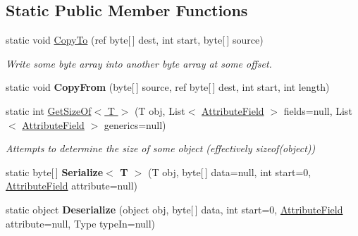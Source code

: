 \subsection*{Static Public Member Functions}
\begin{DoxyCompactItemize}
\item 
static void \hyperlink{class_skyrates_1_1_util_1_1_serializing_1_1_bit_serialize_attribute_ab939972a66980cf31699ec828e872fa8}{Copy\-To} (ref byte\mbox{[}$\,$\mbox{]} dest, int start, byte\mbox{[}$\,$\mbox{]} source)
\begin{DoxyCompactList}\small\item\em Write some byte array into another byte array at some offset. \end{DoxyCompactList}\item 
\hypertarget{class_skyrates_1_1_util_1_1_serializing_1_1_bit_serialize_attribute_ab796a376492fbd2bd32ed0dde197b880}{static void {\bfseries Copy\-From} (byte\mbox{[}$\,$\mbox{]} source, ref byte\mbox{[}$\,$\mbox{]} dest, int start, int length)}\label{class_skyrates_1_1_util_1_1_serializing_1_1_bit_serialize_attribute_ab796a376492fbd2bd32ed0dde197b880}

\item 
static int \hyperlink{class_skyrates_1_1_util_1_1_serializing_1_1_bit_serialize_attribute_a871ad3a2f20271548d0870908ce4df13}{Get\-Size\-Of$<$ T $>$} (T obj, List$<$ \hyperlink{class_skyrates_1_1_util_1_1_serializing_1_1_bit_serialize_attribute_1_1_attribute_field}{Attribute\-Field} $>$ fields=null, List$<$ \hyperlink{class_skyrates_1_1_util_1_1_serializing_1_1_bit_serialize_attribute_1_1_attribute_field}{Attribute\-Field} $>$ generics=null)
\begin{DoxyCompactList}\small\item\em Attempts to determine the size of some object (effectively sizeof(object)) \end{DoxyCompactList}\item 
\hypertarget{class_skyrates_1_1_util_1_1_serializing_1_1_bit_serialize_attribute_ad90f1994f9b3222b2fd6aabf072d8e0d}{static byte\mbox{[}$\,$\mbox{]} {\bfseries Serialize$<$ T $>$} (T obj, byte\mbox{[}$\,$\mbox{]} data=null, int start=0, \hyperlink{class_skyrates_1_1_util_1_1_serializing_1_1_bit_serialize_attribute_1_1_attribute_field}{Attribute\-Field} attribute=null)}\label{class_skyrates_1_1_util_1_1_serializing_1_1_bit_serialize_attribute_ad90f1994f9b3222b2fd6aabf072d8e0d}

\item 
\hypertarget{class_skyrates_1_1_util_1_1_serializing_1_1_bit_serialize_attribute_a0e06c2b966404195df77b96ae9c55378}{static object {\bfseries Deserialize} (object obj, byte\mbox{[}$\,$\mbox{]} data, int start=0, \hyperlink{class_skyrates_1_1_util_1_1_serializing_1_1_bit_serialize_attribute_1_1_attribute_field}{Attribute\-Field} attribute=null, Type type\-In=null)}\label{class_skyrates_1_1_util_1_1_serializing_1_1_bit_serialize_attribute_a0e06c2b966404195df77b96ae9c55378}


\end{DoxyCompactItemize}
